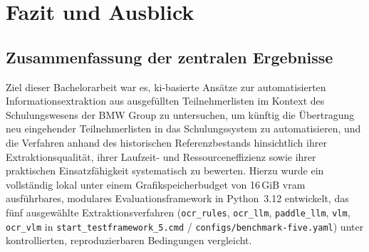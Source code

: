 \chapter{Fazit und Ausblick}
\label{chap:fazit}

\section{Zusammenfassung der zentralen Ergebnisse}
\label{sec:fazit-zusammenfassung}

Ziel dieser Bachelorarbeit war es, \ac{ki}-basierte Ansätze zur automatisierten Informationsextraktion aus ausgefüllten Teilnehmerlisten im Kontext des Schulungswesens der BMW Group zu untersuchen, um künftig die Übertragung neu eingehender Teilnehmerlisten in das Schulungssystem zu automatisieren, und die Verfahren anhand des historischen Referenzbestands hinsichtlich ihrer Extraktionsqualität, ihrer Laufzeit- und Ressourceneffizienz sowie ihrer praktischen Einsatzfähigkeit systematisch zu bewerten. Hierzu wurde ein vollständig lokal unter einem Grafikspeicherbudget von \mbox{16\,GiB} \ac{vram} ausführbares, modulares Evaluationsframework in Python~3.12 entwickelt, das fünf ausgewählte Extraktionsverfahren (\texttt{ocr\_rules}, \texttt{ocr\_llm}, \texttt{paddle\_llm}, \texttt{vlm}, \texttt{ocr\_vlm} in \texttt{start\_testframework\_5.cmd} / \texttt{configs/benchmark-five.yaml}) unter kontrollierten, reproduzierbaren Bedingungen vergleicht.

